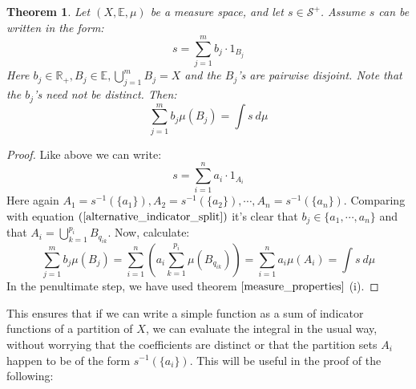 \documentclass[12pt, a4paper]{article}
\newtheorem{theorem}{Theorem}[section]
\numberwithin{equation}{section}
\begin{document}
\begin{theorem}
\label{simple_integral_unique}
Let $(X,\mathbb{E},\mu)$ be a measure space, and let $s\in\mathcal{S}^+$. Assume $s$ can be written in the form:
\begin{equation}
\label{alternative_indicator_split}
s=\sum_{j=1}^m b_j\cdot 1_{B_j}
\end{equation}
Here $b_j\in\mathbb{R}_+, B_j\in\mathbb{E}, \bigcup_{j=1}^m B_j=X$ and the $B_j$'s are pairwise disjoint. Note that the $b_j$'s need not be distinct. Then:
\begin{equation}
\sum_{j=1}^m b_j\mu(B_j)=\int s\ d\mu
\end{equation}
\end{theorem}
\begin{proof}
Like above we can write:
\begin{equation}
s=\sum_{i=1}^n a_i\cdot 1_{A_i}
\end{equation}
Here again $A_1=s^{-1}(\{a_1\}),A_2=s^{-1}(\{a_2\}),\cdots,A_n=s^{-1}(\{a_n\})$. Comparing with equation $(\ref{alternative_indicator_split})$ it's clear that $b_j\in\{a_1,\cdots,a_n\}$ and that $A_i=\bigcup_{k=1}^{p_i}B_{q_{ik}}$. Now, calculate:
\begin{equation}
\sum_{j=1}^m b_j\mu(B_j)=\sum_{i=1}^n\left(a_i\sum_{k=1}^{p_i}\mu(B_{q_{ik}})\right)=\sum_{i=1}^n a_i\mu(A_i)=\int s\ d\mu
\end{equation}
In the penultimate step, we have used theorem $\ref{measure_properties}$ (i). \end{proof}

This ensures that if we can write a simple function as a sum of indicator functions of a partition of $X$, we can evaluate the integral in the usual way, without worrying that the coefficients are distinct or that the partition sets $A_i$ happen to be of the form $s^{-1}(\{a_i\})$. This will be useful in the proof of the following:
\end{document}
